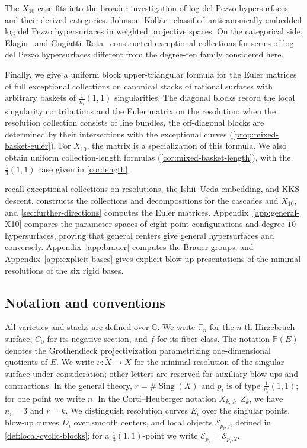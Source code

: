 \documentclass[11pt]{article}
\theoremstyle{plain}
\theoremstyle{definition}
\theoremstyle{remark}
\newcommand{\Pp}{\mathbb P}
\begin{document}
The $X_{10}$ case fits into the broader investigation of log del Pezzo hypersurfaces and their derived categories. Johnson--Koll\'ar~\cite{JohnsonKollar2001} classified anticanonically embedded log del Pezzo hypersurfaces in weighted projective spaces. On the categorical side, Elagin~\cite{Elagin2007} and Gugiatti--Rota~\cite{GugiattiRota2023} constructed exceptional collections for series of log del Pezzo hypersurfaces different from the degree-ten family considered here.

Finally, we give a uniform block upper-triangular formula for the Euler
matrices of full exceptional collections on canonical stacks of rational
surfaces with arbitrary baskets of $\tfrac1{n_i}(1,1)$ singularities.
The diagonal blocks record the local singularity contributions and the
Euler matrix on the resolution; when the resolution collection consists
of line bundles, the off-diagonal blocks are determined by their
intersections with the exceptional curves (\cref{prop:mixed-basket-euler}).
For $X_{10}$, the matrix is a specialization of this formula. We also
obtain uniform collection-length formulas (\cref{cor:mixed-basket-length}),
with the $\tfrac13(1,1)$ case given in \cref{cor:length}.

 recall exceptional
collections on resolutions, the Ishii--Ueda embedding, and KKS descent.
 constructs the collections and decompositions for the
cascades and $X_{10}$, and \cref{sec:further-directions} computes the Euler
matrices. Appendix~\ref{app:general-X10} compares the parameter spaces of
eight-point configurations and degree-$10$ hypersurfaces, proving that
general centers give general hypersurfaces and conversely.
Appendix~\ref{app:brauer} computes the Brauer groups, and
Appendix~\ref{app:explicit-bases} gives explicit blow-up presentations of
the minimal resolutions of the six rigid bases.

\subsection*{Notation and conventions}

All varieties and stacks are defined over \(\mathbb C\).
We write $\mathbb F_n$ for the $n$-th Hirzebruch surface, $C_0$ for its
negative section, and $f$ for its fiber class. The notation $\Pp(E)$
denotes the Grothendieck projectivization parametrizing one-dimensional
quotients of $E$. We write $\nu:\widetilde X\to X$ for the minimal
resolution of the singular surface under consideration; other letters
are reserved for auxiliary blow-ups and contractions.
In the general theory, $r=\#\operatorname{Sing}(X)$ and $p_i$ is of type
$\tfrac1{n_i}(1,1)$; for one point we write $n$. In the Corti--Heuberger notation
$X_{k,d}$, $Z_k$, we have $n_i=3$ and $r=k$. We distinguish resolution
curves $E_i$ over the singular points, blow-up curves $D_i$ over smooth
centers, and local objects $\mathcal E_{p_i,j}$, defined in
\cref{def:local-cyclic-blocks}; for a $\tfrac13(1,1)$-point we write
$\mathcal E_{p_i}=\mathcal E_{p_i,2}$.
\end{document}

